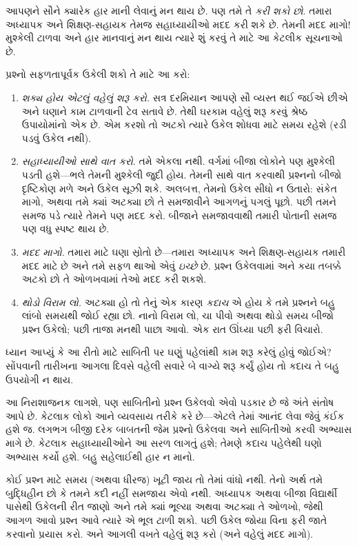 \documentclass[../../../include/open-logic-section]{subfiles}
\begin{document}


આપણને સૌને ક્યારેક હાર માની લેવાનું મન થાય છે. પણ તમે તે
\emph{કરી શકો છો}. તમારા અધ્યાપક અને શિક્ષણ-સહાયક તેમજ
સહાધ્યાયીઓ મદદ કરી શકે છે. તેમની મદદ માગો!{} મુશ્કેલી
ટાળવા અને હાર માનવાનું મન થાય ત્યારે શું કરવું તે માટે
આ કેટલીક સૂચનાઓ છે.

પ્રશ્નો સફળતાપૂર્વક ઉકેલી શકો તે માટે આ કરો:
\begin{enumerate}
\item \emph{શક્ય હોય એટલું વહેલું શરૂ કરો.} સત્ર દરમિયાન
  આપણે સૌ વ્યસ્ત થઈ જઈએ છીએ અને ઘણાને કામ ટાળવાની ટેવ
  સતાવે છે. તેથી ઘરકામ વહેલું શરૂ કરવું શ્રેષ્ઠ ઉપાયોમાંનો
  એક છે. એમ કરશો તો અટકો ત્યારે ઉકેલ શોધવા માટે સમય
  રહેશે (રડી પડવું ઉકેલ નથી).
\item \emph{સહાધ્યાયીઓ સાથે વાત કરો}. તમે એકલા નથી.
  વર્ગમાં બીજા લોકોને પણ મુશ્કેલી પડતી હશે---ભલે તેમની
  મુશ્કેલી જુદી હોય. તેમની સાથે વાત કરવાથી પ્રશ્નનો બીજો
  દૃષ્ટિકોણ મળે અને ઉકેલ સૂઝી શકે. અલબત્ત, તેમનો ઉકેલ
  સીધો ન ઉતારો: સંકેત માગો, અથવા તમે ક્યાં અટક્યા છો તે
  સમજાવીને આગળનું પગલું પૂછો. પછી તમને સમજ પડે ત્યારે
  તેમને પણ મદદ કરો. બીજાને સમજાવવાથી તમારી પોતાની
  સમજ પણ વધુ સ્પષ્ટ થાય છે.
\item \emph{મદદ માગો.} તમારા માટે ઘણા સ્રોતો છે---તમારા
  અધ્યાપક અને શિક્ષણ-સહાયક તમારી મદદ માટે છે અને તમે
  સફળ થાઓ એવું \emph{ઇચ્છે} છે. પ્રશ્ન ઉકેલવામાં અને
  કયા તબક્કે અટકો છો તે ઓળખવામાં તેઓ મદદ કરી શકશે.
\item \emph{થોડો વિરામ લો.} અટક્યા હો તો તેનું એક કારણ
  \emph{કદાચ} એ હોય કે તમે પ્રશ્નને બહુ લાંબો સમયથી જોઈ રહ્યા છો.
  નાનો વિરામ લો, ચા પીવો અથવા થોડો સમય બીજો પ્રશ્ન
  ઉકેલો; પછી તાજા મનથી પાછા આવો. એક રાત ઊંઘ્યા પછી
  ફરી વિચારો.
\end{enumerate}

ધ્યાન આપ્યું કે આ રીતો માટે સાબિતી પર ઘણું પહેલાંથી કામ
શરૂ કરેલું હોવું જોઈએ? સોંપવાની તારીખના આગલા દિવસે
વહેલી સવારે બે વાગ્યે શરૂ કર્યું હોય તો કદાચ તે બહુ
ઉપયોગી ન થાય.

આ નિરાશાજનક લાગશે, પણ સાબિતીનો પ્રશ્ન ઉકેલવો એવો પડકાર
છે જે અંતે સંતોષ આપે છે. કેટલાક લોકો આને વ્યવસાય તરીકે
કરે છે---એટલે તેમાં આનંદ લેવા જેવું કંઈક હશે જ. લગભગ
બીજી દરેક બાબતની જેમ પ્રશ્નો ઉકેલવા અને સાબિતીઓ કરવી
અભ્યાસ માગે છે. કેટલાક સહાધ્યાયીઓને આ સરળ લાગતું હશે;
તેમણે કદાચ પહેલેથી ઘણો અભ્યાસ કર્યો હશે. બહુ સહેલાઈથી
હાર ન માનો.

કોઈ પ્રશ્ન માટે સમય (અથવા ધીરજ) ખૂટી જાય તો તેમાં વાંધો
નથી. તેનો અર્થ તમે બુદ્ધિહીન છો કે તમને કદી નહીં સમજાય
એવો નથી. અધ્યાપક અથવા બીજા વિદ્યાર્થી પાસેથી ઉકેલની
રીત જાણો અને તમે ક્યાં ભૂલ્યા અથવા અટક્યા તે ઓળખો,
જેથી આગળ આવો પ્રશ્ન આવે ત્યારે એ ભૂલ ટાળી શકો. પછી
ઉકેલ જોયા વિના ફરી જાતે કરવાનો પ્રયાસ કરો. અને આગલી
વખતે વહેલું શરૂ કરો (અને વહેલું મદદ માગો).
\end{document}
